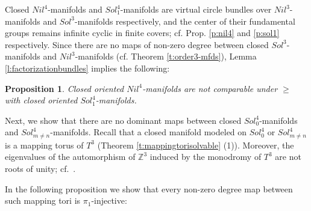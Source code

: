 \documentclass[12pt]{amsart}
\newtheorem{prop}[thm]{Proposition}
\theoremstyle{remark}
\begin{document}
Closed $Nil^4$-manifolds and $Sol_1^4$-manifolds are virtual circle bundles over $Nil^3$-manifolds and $Sol^3$-manifolds respectively, and the center of their fundamental groups remains infinite cyclic in finite covers; cf. Prop. \ref{p:nil4} and \ref{p:sol1} respectively. Since there are no maps of non-zero degree between closed $Sol^3$-manifolds and $Nil^3$-manifolds (cf. Theorem \ref{t:order3-mfds}), Lemma \ref{l:factorizationbundles} implies the following:

\begin{prop}
 Closed oriented $Nil^4$-manifolds are not comparable under $\geq$ with closed oriented $Sol_1^4$-manifolds. 
\end{prop}

Next, we show that there are no dominant maps between closed $Sol_0^4$-manifolds and $Sol_{m \neq n}^4$-manifolds. Recall that a closed manifold modeled on $Sol_0^4$ or $Sol_{m \neq n}^4$ is a mapping torus of $T^3$ (Theorem \ref{t:mappingtorisolvable} (1)). Moreover, the eigenvalues of the automorphism
of ${\mathbb{Z}}^3$ induced by the monodromy of $T^3$ are not roots of unity; cf.~\cite[pg. 164/165]{Hillman}. 

In the following proposition we show that every non-zero degree map between such mapping tori is $\pi_1$-injective: 
\end{document}
